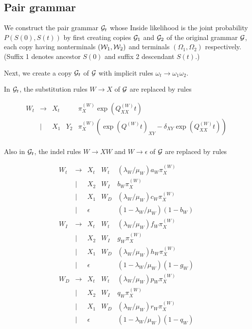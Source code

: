 \documentclass{article}
\begin{document}
\subsection{Pair grammar}

We construct the pair grammar ${\cal G}_t$ whose Inside likelihood is the joint probability $P(S(0),S(t))$
by first creating copies ${\cal G}_1$ and ${\cal G}_2$ of the original grammar ${\cal G}$,
each copy having nonterminals $({\cal W}_1,{\cal W}_2)$ and terminals $(\Omega_1,\Omega_2)$ respectively.
(Suffix 1 denotes ancestor $S(0)$ and suffix 2 descendant $S(t)$.)

Next, we create a copy ${\cal G}_t$ of ${\cal G}$ with implicit rules $\omega_t \to \omega_1 \omega_2$.

In ${\cal G}_t$, the substitution rules $W \to X$ of ${\cal G}$ are replaced by rules

\[
\begin{array}{rclll}
  W_t & \to & X_t & & \pi^{(W)}_X \exp(Q^{(W)}_{XX} t) \\
      & | & X_1 & Y_2 & \pi^{(W)}_X (\exp(Q^{(W)} t)_{XY} - \delta_{XY} \exp(Q^{(W)}_{XX} t)) \\
\end{array}
\]

Also in ${\cal G}_t$, the indel rules $W \to X W$ and $W\to\epsilon$ of ${\cal G}$ are replaced by rules

\[
\begin{array}{rclll}
  W_t & \to & X_t & W_t & (\lambda_W/\mu_W) a_W \pi^{(W)}_X  \\
      & | & X_2 & W_I & b_W \pi^{(W)}_X \\
      & | & X_1 & W_D & (\lambda_W/\mu_W) c_W \pi^{(W)}_X \\
      & | & \epsilon & & (1 - \lambda_W/\mu_W) (1-b_W) \\
  W_I & \to & X_t & W_t & (\lambda_W/\mu_W) f_W \pi^{(W)}_X \\
      & | & X_2 & W_I & g_W \pi^{(W)}_X \\
      & | & X_1 & W_D & (\lambda_W/\mu_W) h_W \pi^{(W)}_X \\
      & | & \epsilon & & (1 - \lambda_W/\mu_W) (1-g_W) \\
  W_D & \to & X_t & W_t & (\lambda_W/\mu_W) p_W \pi^{(W)}_X \\
      & | & X_2 & W_I & q_W \pi^{(W)}_X \\
      & | & X_1 & W_D & (\lambda_W/\mu_W) r_W \pi^{(W)}_X \\
      & | & \epsilon & & (1 - \lambda_W/\mu_W) (1-q_W) \\
\end{array}
\]



\end{document}
